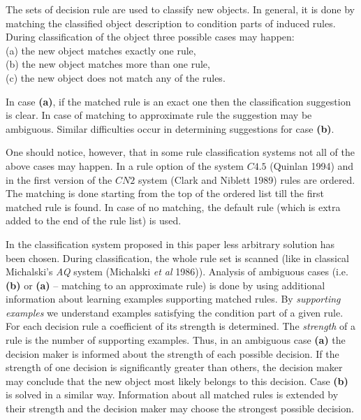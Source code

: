 The sets of decision rule are used to classify new objects.
 In  general,  it  is done by matching the classified object
description to condition parts of induced rules. During
classification  of  the  object  three possible cases may happen:\\
(a) the new object matches exactly one rule,\\
(b) the new object matches more than one rule,\\
(c) the new object does not match any of the rules.

In  case  {\bf (a)},  if  the  matched  rule  is   an   exact   one
then  the classification  suggestion   is   clear.   In   case   of
matching    to  approximate   rule   the    suggestion    may    be
ambiguous.   Similar difficulties occur in determining  suggestions
for case {\bf (b)}.

One should notice, however, that in some rule classification  systems
not all of the above cases may happen. In a rule option of the system
$C4.5$ (Quinlan 1994) and in the first version of the $CN2$
system (Clark and Niblett 1989) rules are ordered. The matching is done
starting from the top of the ordered list till  the  first  matched
rule is found. In case of no matching, the default  rule  (which  is
extra added to the end of the rule list) is used.

In  the  classification  system  proposed  in  this   paper    less
arbitrary solution has been chosen. During classification,  the   whole
rule  set  is scanned  (like  in  classical  Michalski's  {\it  AQ}
system  (Michalski {\it et al} 1986)).
Analysis of ambiguous cases (i.e. {\bf  (b)}
or {\bf (a)} -- matching to an approximate rule) is done by using
additional  information   about    learning    examples  supporting
matched  rules.  By  {\it  supporting   examples}   we   understand
examples satisfying the condition part  of  a   given   rule.   For
each  decision  rule  a   coefficient   of    its    strength    is
determined.  The  {\it  strength}  of  a  rule  is  the  number  of
supporting  examples.  Thus, in an ambiguous  case  {\bf  (a)}  the
decision maker is informed about the  strength  of  each   possible
decision.  If  the  strength  of  one  decision   is  significantly
greater than others, the decision  maker  may   conclude  that  the
new object most likely belongs to this decision.
Case {\bf (b)} is solved  in a
similar way. Information about all matched  rules  is  extended  by
their  strength  and   the   decision   maker   may   choose    the
strongest possible decision.

